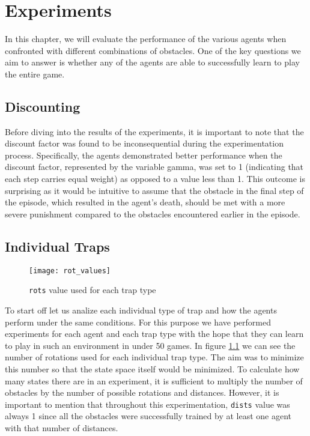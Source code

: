 \chapter{Experiments}
In this chapter, we will evaluate the performance of the various agents when confronted with different combinations of obstacles. One of the key questions we aim to answer is whether any of the agents are able to successfully learn to play the entire game.

\section{Discounting}
Before diving into the results of the experiments, it is important to note that the discount factor was found to be inconsequential during the experimentation process. Specifically, the agents demonstrated better performance when the discount factor, represented by the variable gamma, was set to 1 (indicating that each step carries equal weight) as opposed to a value less than 1. This outcome is surprising as it would be intuitive to assume that the obstacle in the final step of the episode, which resulted in the agent's death, should be met with a more severe punishment compared to the obstacles encountered earlier in the episode.

\section{Individual Traps}
\begin{figure}[h]
    \centering
    \texttt{[image: rot\_values]}
    \caption{\texttt{rots} value used for each trap type}
    \label{fig:rot_values}
\end{figure}

To start off let us analize each individual type of trap and how the agents perform under the same conditions. For this purpose we have performed experiments for each agent and each trap type with the hope that they can learn to play in such an environment in under 50 games.  In figure \ref{fig:rot_values} we can see the number of rotations used for each individual trap type. The aim was to minimize this number so that the state space itself would be minimized. To calculate how many states there are in an experiment, it is sufficient  to multiply the number of obstacles by the number of possible rotations and distances. However, it is important to mention that throughout this experimentation, \texttt{dists} value was always 1 since all the obstacles were successfully trained by at least one agent with that number of distances.

